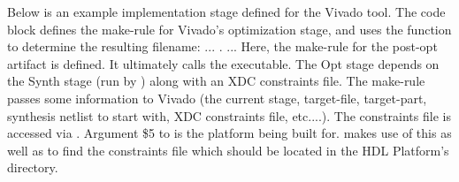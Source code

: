 Below is an example implementation stage defined for the Vivado tool. The code block defines the make-rule for Vivado's optimization stage, and uses the  function to determine the resulting filename:\newline
\setlength{\leftskip}{1cm}
\newline{}\newline ...\newline
\setlength{\parindent}{1cm}
\newline
\indent        {}.\newline
\indent        {}\newline
\indent\indent         {}\newline
\indent\indent         {}\newline
\indent\indent         {}\newline
\indent\indent         {}\newline
\indent\indent         {}\newline
\indent\indent         {}\newline
\indent\indent         {}\newline
\indent\indent         {}\newline
...\newline
{}\newline\newline
\setlength{\parindent}{0cm}
Here, the make-rule for the post-opt artifact is defined. It ultimately calls the  executable. The Opt stage depends on the Synth stage (run by ) along with an XDC constraints file. The make-rule passes some information to Vivado (the current stage, target-file, target-part, synthesis netlist to start with, XDC constraints file, etc....). The constraints file is accessed via . Argument \$5 to  is the platform being built for.  makes use of this as well as  to find the constraints file which should be located in the HDL Platform's directory.\newline

